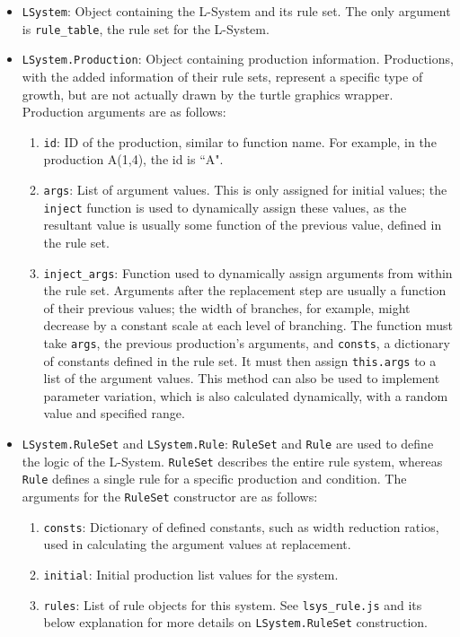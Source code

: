 \documentclass{article}
\begin{document}
\begin{itemize}
    \item \verb|LSystem|: Object containing the L-System and its rule set. The only argument is
\verb|rule_table|, the rule set for the L-System.
    \item \verb|LSystem.Production|: Object containing production information. Productions, with
the added information of their rule sets, represent a specific type of growth, but are not actually
drawn by the turtle graphics wrapper. Production arguments are as follows:
    \begin{enumerate}
        \item \verb|id|: ID of the production, similar to function name. For example, in the
production A(1,4), the id is ``A".
        \item \verb|args|: List of argument values. This is only assigned for initial values; the
\verb|inject| function is used to dynamically assign these values, as the resultant value is
usually some function of the previous value, defined in the rule set.
        \item \verb|inject_args|: Function used to dynamically assign arguments from within the
rule set. Arguments after the replacement step are usually a function of their previous values;
the width of branches, for example, might decrease by a constant scale at each level of branching.
The function must take \verb|args|, the previous production's arguments, and \verb|consts|, a
dictionary of constants defined in the rule set. It must then assign \verb|this.args| to a list of
the argument values. This method can also be used to implement parameter variation, which is also
calculated dynamically, with a random value and specified range.

    \end{enumerate}
    \item \verb|LSystem.RuleSet| and \verb|LSystem.Rule|: \verb|RuleSet| and \verb|Rule| are used
to define the logic of the L-System. \verb|RuleSet| describes the entire rule system, whereas \verb|Rule|
defines a single rule for a specific production and condition. The arguments for the \verb|RuleSet|
constructor are as follows:
    \begin{enumerate}
        \item \verb|consts|: Dictionary of defined constants, such as width reduction ratios, used
    in calculating the argument values at replacement.
        \item \verb|initial|: Initial production list values for the system.
        \item \verb|rules|: List of rule objects for this system.
See \verb|lsys_rule.js| and its below explanation for more details on \verb|LSystem.RuleSet|
construction.


\end{enumerate}
\end{itemize}
\end{document}
